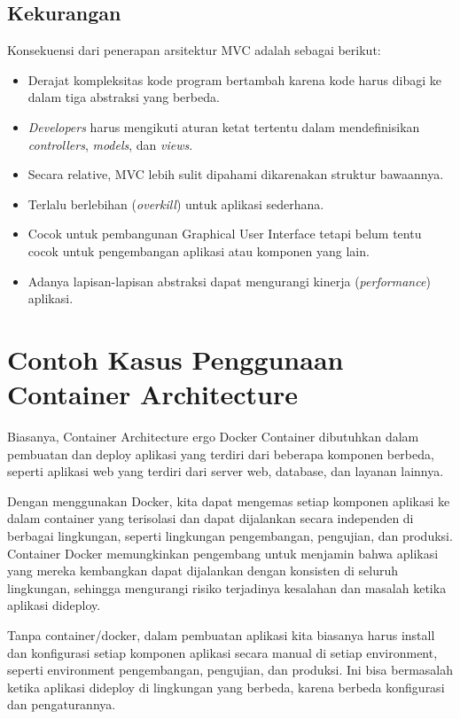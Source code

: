 \subsection{Kekurangan}
Konsekuensi dari penerapan arsitektur MVC adalah sebagai berikut:
\begin{itemize}
\item Derajat kompleksitas kode program bertambah karena kode harus dibagi ke dalam tiga abstraksi yang berbeda.
\item \textit{Developers} harus mengikuti aturan ketat tertentu dalam mendefinisikan \textit{controllers}, \textit{models}, dan \textit{views}. 
\item Secara relative, MVC lebih sulit dipahami dikarenakan struktur bawaannya.
\item Terlalu berlebihan (\textit{overkill}) untuk aplikasi sederhana.
\item Cocok untuk pembangunan Graphical User Interface tetapi belum tentu cocok untuk pengembangan aplikasi atau komponen yang lain. 
\item Adanya lapisan-lapisan abstraksi dapat mengurangi kinerja (\textit{performance}) aplikasi.
\end{itemize}

\section{Contoh Kasus Penggunaan Container Architecture}

Biasanya, Container Architecture ergo Docker Container dibutuhkan dalam pembuatan dan deploy aplikasi yang terdiri dari beberapa komponen berbeda, seperti {aplikasi web} yang terdiri dari server web, database, dan layanan lainnya.

Dengan menggunakan Docker, kita dapat mengemas setiap komponen aplikasi ke dalam container yang terisolasi dan dapat dijalankan secara independen di berbagai lingkungan, seperti lingkungan pengembangan, pengujian, dan produksi. Container Docker memungkinkan pengembang untuk menjamin bahwa aplikasi yang mereka kembangkan dapat dijalankan dengan konsisten di seluruh lingkungan, sehingga mengurangi risiko terjadinya kesalahan dan masalah ketika aplikasi dideploy.

Tanpa container/docker, dalam pembuatan aplikasi kita biasanya harus install dan konfigurasi setiap komponen aplikasi secara manual di setiap environment, seperti environment pengembangan, pengujian, dan produksi. Ini bisa bermasalah ketika aplikasi dideploy di lingkungan yang berbeda, karena berbeda konfigurasi dan pengaturannya. 

